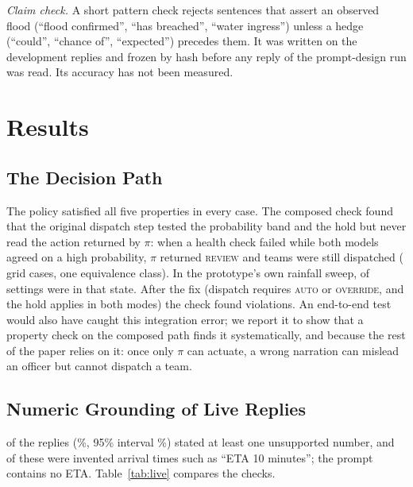 \documentclass[conference]{IEEEtran}
\begin{document}
\textit{Claim check.} A short pattern check rejects sentences that assert an observed flood (``flood confirmed'', ``has breached'', ``water ingress'') unless a hedge (``could'', ``chance of'', ``expected'') precedes them. It was written on the development replies and frozen by hash before any reply of the prompt-design run was read. Its accuracy has not been measured.

\section{Results}
\subsection{The Decision Path}
\label{sec:audit}
The policy satisfied all five properties in every case. The composed check found that the original dispatch step tested the probability band and the hold but never read the action returned by $\pi$: when a health check failed while both models agreed on a high probability, $\pi$ returned \textsc{review} and teams were still dispatched (\EtoEViolBefore{} grid cases, one equivalence class). In the prototype's own rainfall sweep, \SweepAutoRel{} of \SweepN{} settings were in that state. After the fix (dispatch requires \textsc{auto} or \textsc{override}, and the hold applies in both modes) the check found \EtoEViolAfter{} violations. An end-to-end test would also have caught this integration error; we report it to show that a property check on the composed path finds it systematically, and because the rest of the paper relies on it: once only $\pi$ can actuate, a wrong narration can mislead an officer but cannot dispatch a team.

\subsection{Numeric Grounding of Live Replies}
\LiveUnsup{} of the \LiveN{} replies (\LiveUnsupPct\%, 95\% interval \LiveUnsupCi\%) stated at least one unsupported number, and \LiveEta{} of these \LiveUnsup{} were invented arrival times such as ``ETA 10 minutes''; the prompt contains no ETA. Table~\ref{tab:live} compares the checks.
\end{document}

